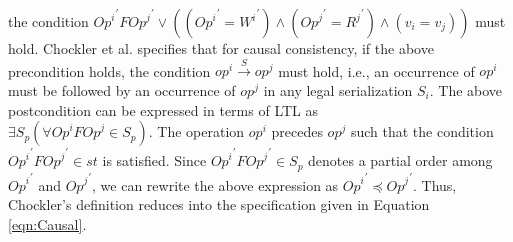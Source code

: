\documentclass{sig-alternate-05-2015}
\begin{document}
the condition $ {\mathit{Op}^i}^{'} F {\mathit{Op}^j}^{'} \vee
 \left( \left( {\mathit{Op}^i}^{'} = {W^i}^{'} \right) \wedge \left( {\mathit{Op}^j}^{'} = {R^j}^{'} \right) \wedge
   \left( v_i = v_j \right) \right)$ must hold. %
 Chockler et al. specifies that for causal consistency, if the above
precondition holds, the condition $\mathit{op}^i \xrightarrow{S}\mathit{op}^j$ must hold,
i.e., an occurrence of $\mathit{op}^i$ must be followed by an occurrence of $\mathit{op}^j$ in any
 legal serialization ${S_i}$.
 The above postcondition can be expressed in terms of LTL as \\ $\exists S_p \left( \forall \mathit{Op}^i F \mathit{Op}^j \in
S_p \right)$.  The operation $\mathit{op}^i$ precedes $\mathit{op}^j$ such
  that the condition ${\mathit{Op}^i}^{'} F {\mathit{Op}^j}^{'} \in \mathit{st}$ is satisfied. Since ${\mathit{Op}^i}^{'}  F {\mathit{Op}^j}^{'}  \in S_p$ denotes a partial order among ${\mathit{Op}^i}^{'} $ and ${\mathit{Op}^j}^{'}$, we can rewrite the above expression as  ${\mathit{Op}^i}^{'}  \preccurlyeq {\mathit{Op}^j}^{'} $. Thus, Chockler's definition reduces into the specification given in Equation \ref{eqn:Causal}. 
\end{document}
